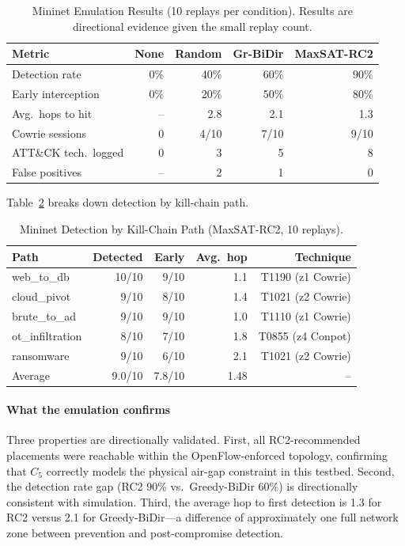 \documentclass[journal]{IEEEtran}
\begin{document}
\begin{table}[t]
\caption{Mininet Emulation Results (10 replays per condition).
  Results are directional evidence given the small replay count.}
\label{tab:emulation}
\centering
\renewcommand{\arraystretch}{1.2}
\begin{tabular}{lrrrr}
\toprule
Metric & None & Random & Gr-BiDir & MaxSAT-RC2 \\
\midrule
Detection rate     & 0\%  & 40\%   & 60\%   & 90\% \\
Early interception & 0\%  & 20\%   & 50\%   & 80\% \\
Avg.\ hops to hit  & --   & 2.8    & 2.1    & 1.3  \\
Cowrie sessions    & 0    & 4/10   & 7/10   & 9/10 \\
ATT\&CK tech.\ logged & 0 & 3      & 5      & 8    \\
False positives    & --   & 2      & 1      & 0    \\
\bottomrule
\end{tabular}
\end{table}

Table~\ref{tab:emulation_paths} breaks down detection by kill-chain
path.

\begin{table}[t]
\caption{Mininet Detection by Kill-Chain Path (MaxSAT-RC2,
  10 replays).}
\label{tab:emulation_paths}
\centering
\renewcommand{\arraystretch}{1.2}
\begin{tabular}{lrrrr}
\toprule
Path & Detected & Early & Avg.\ hop & Technique \\
\midrule
web\_to\_db      & 10/10 & 9/10 & 1.1 & T1190 (z1 Cowrie) \\
cloud\_pivot     & 9/10  & 8/10 & 1.4 & T1021 (z2 Cowrie) \\
brute\_to\_ad    & 9/10  & 9/10 & 1.0 & T1110 (z1 Cowrie) \\
ot\_infiltration & 8/10  & 7/10 & 1.8 & T0855 (z4 Conpot) \\
ransomware       & 9/10  & 6/10 & 2.1 & T1021 (z2 Cowrie) \\
\midrule
Average & 9.0/10 & 7.8/10 & 1.48 & -- \\
\bottomrule
\end{tabular}
\end{table}

\paragraph{What the emulation confirms}
Three properties are directionally validated. First, all
RC2-recommended placements were reachable within the OpenFlow-enforced
topology, confirming that $C_5$ correctly models the physical air-gap
constraint in this testbed. Second, the detection rate gap (RC2 90\%
vs.\ Greedy-BiDir 60\%) is directionally consistent with simulation.
Third, the average hop to first detection is 1.3 for RC2 versus 2.1
for Greedy-BiDir---a difference of approximately one full network zone
between prevention and post-compromise detection.
\end{document}
